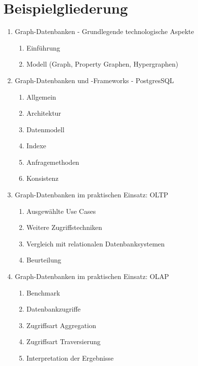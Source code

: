 \chapter*{Beispielgliederung}
    \begin{enumerate}
        \item Graph-Datenbanken - Grundlegende technologische Aspekte
        \begin{enumerate}[label*=\arabic*.]
            \item Einführung
            \item Modell (Graph, Property Graphen, Hypergraphen)
        \end{enumerate}
        \item Graph-Datenbanken und -Frameworks - PostgresSQL
        \begin{enumerate}[label*=\arabic*.]
            \item Allgemein
            \item Architektur
            \item Datenmodell
            \item Indexe
            \item Anfragemethoden
            \item Konsistenz
        \end{enumerate}
        \item Graph-Datenbanken im praktischen Einsatz: OLTP
            \begin{enumerate}[label*=\arabic*.]
                \item Ausgewählte Use Cases
                \item Weitere Zugriffstechniken
                \item Vergleich mit relationalen Datenbanksystemen
                \item Beurteilung
            \end{enumerate}
        \item Graph-Datenbanken im praktischen Einsatz: OLAP
        \begin{enumerate}[label*=\arabic*.]
            \item Benchmark
            \item Datenbankzugriffe
            \item Zugriffsart Aggregation
            \item Zugriffsart Traversierung
            \item Interpretation der Ergebnisse
        \end{enumerate}
    \end{enumerate}

